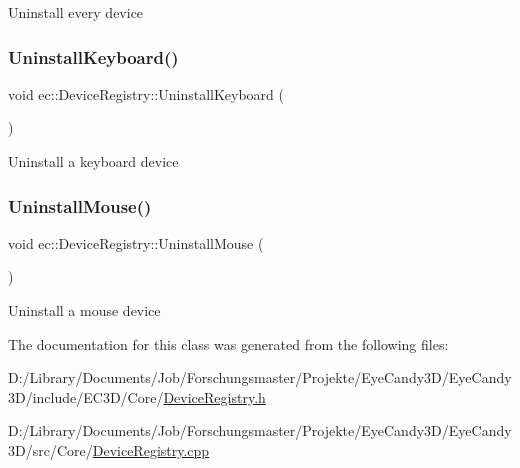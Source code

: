 Uninstall every device \mbox{\label{classec_1_1_device_registry_a412a6a6b52a2b1b755b0d43889a3c755}} 
\subsubsection{\texorpdfstring{Uninstall\+Keyboard()}{UninstallKeyboard()}}
{\footnotesize\ttfamily void ec\+::\+Device\+Registry\+::\+Uninstall\+Keyboard (\begin{DoxyParamCaption}{ }\end{DoxyParamCaption})}

Uninstall a keyboard device \mbox{\label{classec_1_1_device_registry_a12cc6592593ea13bf2ea1d34e93ae6f6}} 
\subsubsection{\texorpdfstring{Uninstall\+Mouse()}{UninstallMouse()}}
{\footnotesize\ttfamily void ec\+::\+Device\+Registry\+::\+Uninstall\+Mouse (\begin{DoxyParamCaption}{ }\end{DoxyParamCaption})}

Uninstall a mouse device 

The documentation for this class was generated from the following files\+:\begin{DoxyCompactItemize}
\item 
D\+:/\+Library/\+Documents/\+Job/\+Forschungsmaster/\+Projekte/\+Eye\+Candy3\+D/\+Eye\+Candy3\+D/include/\+E\+C3\+D/\+Core/\mbox{\hyperlink{_device_registry_8h}{Device\+Registry.\+h}}\item 
D\+:/\+Library/\+Documents/\+Job/\+Forschungsmaster/\+Projekte/\+Eye\+Candy3\+D/\+Eye\+Candy3\+D/src/\+Core/\mbox{\hyperlink{_device_registry_8cpp}{Device\+Registry.\+cpp}}\end{DoxyCompactItemize}
